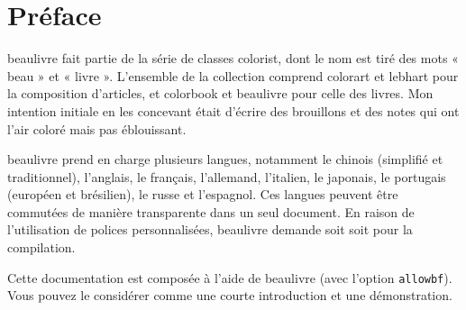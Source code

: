 \documentclass[English,Chinese,French,allowbf,puretext]{beaulivre}
\theoremstyle{basic}
\theoremstyle{emphasis}
\theoremstyle{simple}
\providecommand{\colorist}{\textsf{colorist}}
\providecommand{\colorart}{\textsf{colorart}}
\providecommand{\colorbook}{\textsf{colorbook}}
\providecommand{\lebhart}{\textsf{lebhart}}
\providecommand{\beaulivre}{\textsf{beaulivre}}
\begin{document}
\frontmatter

\begin{titlepage} %
%
\end{titlepage}%
\cleardoublepage%


\chapter*{Préface}

\beaulivre{} fait partie de la série de classes \colorist{}, dont le nom est tiré des mots « beau » et « livre ». L'ensemble de la collection comprend \colorart{} et \lebhart{} pour la composition d'articles, et \colorbook{} et \beaulivre{} pour celle des livres. Mon intention initiale en les concevant était d'écrire des brouillons et des notes qui ont l'air coloré mais pas éblouissant.

\beaulivre{} prend en charge plusieurs langues, notamment le chinois (simplifié et traditionnel), l'anglais, le français, l'allemand, l'italien, le japonais, le portugais (européen et brésilien), le russe et l'espagnol. Ces langues peuvent être commutées de manière transparente dans un seul document. En raison de l'utilisation de polices personnalisées, \beaulivre{} demande soit  soit  pour la compilation.

Cette documentation est composée à l'aide de \beaulivre{} (avec l'option \texttt{allowbf}). Vous pouvez le considérer comme une courte introduction et une démonstration.
\end{document}
